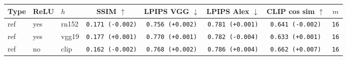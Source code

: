 \begin{tabular}{|l|l|l|c|c|c|c|c|}
\hline
Type & ReLU & $h$ & SSIM $\uparrow$ & LPIPS VGG $\downarrow$ & LPIPS Alex $\downarrow$ & CLIP cos sim $\uparrow$ & $m$ \\
\hline
ref & yes & rn152 & \texttt{0.171 {\color{red}(-0.002)}} & \texttt{0.756 {\color{red}(+0.002)}} & \texttt{0.781 {\color{red}(+0.001)}} & \texttt{0.641 {\color{red}(-0.002)}} & \texttt{16} \\
\hline
ref & yes & vgg19 & \texttt{0.177 {\color{green}(+0.001)}} & \texttt{0.770 {\color{red}(+0.001)}} & \texttt{0.782 {\color{green}(-0.004)}} & \texttt{0.633 {\color{green}(+0.001)}} & \texttt{16} \\
\hline
ref & no & clip & \texttt{0.162 {\color{red}(-0.002)}} & \texttt{0.768 {\color{red}(+0.002)}} & \texttt{0.786 {\color{red}(+0.004)}} & \texttt{0.662 {\color{green}(+0.007)}} & \texttt{16} \\
\hline
\end{tabular}
